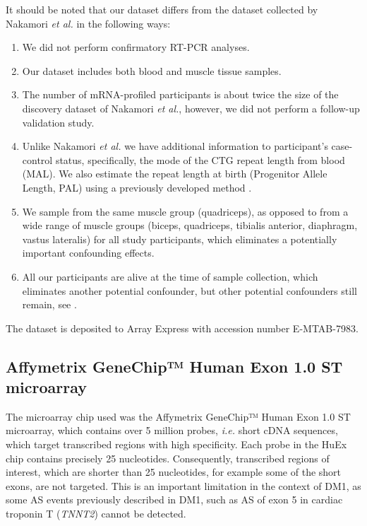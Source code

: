 \documentclass[10pt,letterpaper]{article}
\begin{document}
It should be noted that our dataset differs from the dataset collected by Nakamori {\it et al.} in the following ways:
\begin{enumerate}
\item We did not perform confirmatory RT-PCR analyses.
\item Our dataset includes both blood and muscle tissue samples.
\item The number of mRNA-profiled participants is about twice the size of the discovery dataset of Nakamori {\it et al.}, however, we did not perform a follow-up validation study.
\item Unlike Nakamori {\it et al.} we have additional information to participant's case-control status, specifically, the mode of the CTG repeat length from blood (MAL). We also estimate the repeat length at birth (Progenitor Allele Length, PAL) using a previously developed method \cite{Morales2012}.
\item We sample from the same muscle group (quadriceps), as opposed to from a wide range of muscle groups (biceps, quadriceps, tibialis anterior, diaphragm, vastus lateralis) for all study participants, which eliminates a potentially important confounding effects.
\item All our participants are alive at the time of sample collection, which eliminates another potential confounder, but other potential confounders still remain, see .
\end{enumerate}

The dataset is deposited to Array Express with accession number E-MTAB-7983.

\subsection*{Affymetrix GeneChip™ Human Exon 1.0 ST microarray}

The microarray chip used was the Affymetrix GeneChip™ Human Exon 1.0 ST microarray, which contains over 5 million probes, {\it i.e.} short cDNA sequences, which target transcribed regions with high specificity. Each probe in the HuEx chip contains precisely 25 nucleotides. Consequently, transcribed regions of interest, which are shorter than 25 nucleotides, for example some of the short exons, are not targeted. This is an important limitation in the context of DM1, as some AS events previously described in DM1, such as AS of exon 5 in cardiac troponin T ({\it TNNT2}) \cite{Rexiati2018} cannot be detected.
\end{document}

